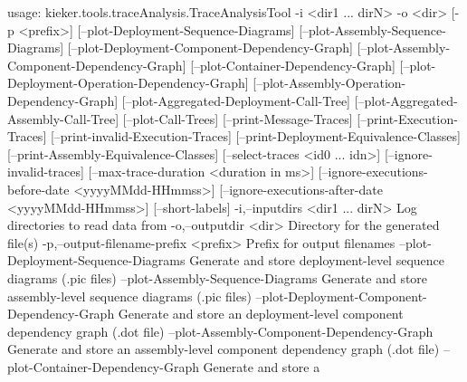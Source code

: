 usage: kieker.tools.traceAnalysis.TraceAnalysisTool -i <dir1 ... dirN> -o <dir>
       [-p <prefix>] [--plot-Deployment-Sequence-Diagrams]
       [--plot-Assembly-Sequence-Diagrams]
       [--plot-Deployment-Component-Dependency-Graph]
       [--plot-Assembly-Component-Dependency-Graph]
       [--plot-Container-Dependency-Graph]
       [--plot-Deployment-Operation-Dependency-Graph]
       [--plot-Assembly-Operation-Dependency-Graph]
       [--plot-Aggregated-Deployment-Call-Tree]
       [--plot-Aggregated-Assembly-Call-Tree] [--plot-Call-Trees]
       [--print-Message-Traces] [--print-Execution-Traces]
       [--print-invalid-Execution-Traces]
       [--print-Deployment-Equivalence-Classes]
       [--print-Assembly-Equivalence-Classes] [--select-traces <id0 ... idn>]
       [--ignore-invalid-traces] [--max-trace-duration <duration in ms>]
       [--ignore-executions-before-date <yyyyMMdd-HHmmss>]
       [--ignore-executions-after-date <yyyyMMdd-HHmmss>] [--short-labels]
 -i,--inputdirs <dir1 ... dirN>                         Log directories to read
                                                        data from
 -o,--outputdir <dir>                                   Directory for the
                                                        generated file(s)
 -p,--output-filename-prefix <prefix>                   Prefix for output
                                                        filenames
    --plot-Deployment-Sequence-Diagrams                 Generate and store
                                                        deployment-level
                                                        sequence diagrams (.pic
                                                        files)
    --plot-Assembly-Sequence-Diagrams                   Generate and store
                                                        assembly-level sequence
                                                        diagrams (.pic files)
    --plot-Deployment-Component-Dependency-Graph        Generate and store an
                                                        deployment-level
                                                        component dependency
                                                        graph (.dot file)
    --plot-Assembly-Component-Dependency-Graph          Generate and store an
                                                        assembly-level component
                                                        dependency graph (.dot
                                                        file)
    --plot-Container-Dependency-Graph                   Generate and store a

